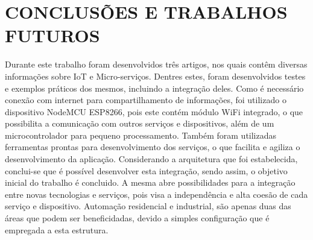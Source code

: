 \section{CONCLUSÕES E TRABALHOS FUTUROS}
Durante este trabalho foram desenvolvidos três artigos, nos quais contêm diversas informações sobre IoT e Micro-serviços. Dentres estes, foram desenvolvidos testes e exemplos práticos dos mesmos, incluindo a integração deles. Como é necessário conexão com internet para compartilhamento de informações, foi utilizado o dispositivo NodeMCU ESP8266, pois este contém módulo WiFi integrado, o que possibilita a comunicação com outros serviços e dispositivos, além de um microcontrolador para pequeno processamento. Também foram utilizadas ferramentas prontas para desenvolvimento dos serviços, o que facilita e agiliza o desenvolvimento da aplicação. Considerando a arquitetura que foi estabelecida, conclui-se que é possível desenvolver esta integração, sendo assim, o objetivo inicial do trabalho é concluido. A mesma abre possibilidades para a integração entre novas tecnologias e serviços, pois visa a independência e alta coesão de cada serviço e dispositivo. Automação residencial e industrial, são apenas duas das áreas que podem ser beneficidadas, devido a simples configuração que é empregada a esta estrutura.